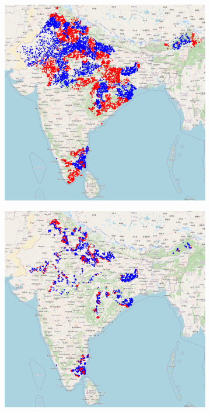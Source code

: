 \documentclass[12pt,a4paper,notitlepage]{article}
\begin{document}
\begin{figure}
\begin{subfigure}{.49\textwidth}
\centering
\includegraphics[width=\linewidth]{images/allDataWinterMonths.png}
\caption{ \label{fig:areas_present}}
\end{subfigure}
\begin{subfigure}{.49\textwidth}
\centering
\includegraphics[width=\linewidth]{images/intraStateWinterMonths.png}

\end{subfigure}
\end{figure}
\end{document}
